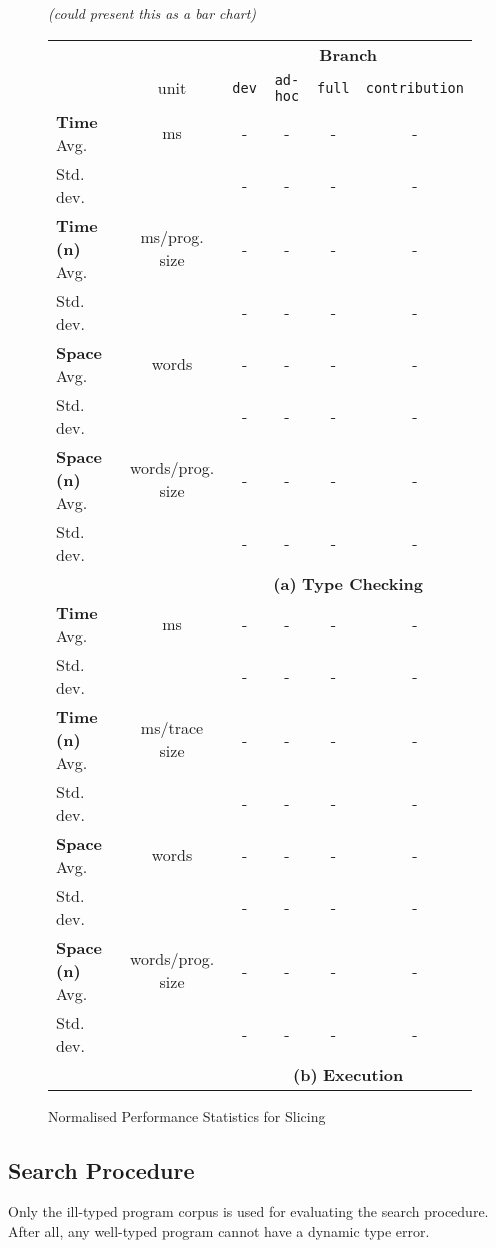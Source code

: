 \begin{figure}
  \centering
  \textit{(could present this as a bar chart)}
  \begin{tabular}{lc|cccc}
  & & \multicolumn{4}{c}{\textbf{Branch}}\\
   & unit & \texttt{dev} & \texttt{ad-hoc} & \texttt{full} & \texttt{contribution}\\
   \hline
   \textbf{Time} Avg. & ms &  - & - & - & -\\
   Std. dev. &  &  - & - & - & -\\
   \textbf{Time (n)} Avg.& ms/prog. size& - & - & - & -\\
   Std. dev. &  &  - & - & - & -\\
   \textbf{Space} Avg. & words& - & - & - & -\\
   Std. dev. &  &  - & - & - & -\\
   \textbf{Space (n)} Avg. & words/prog. size& - & - & - & -\\
   Std. dev. &  &  - & - & - & -\\
   && \multicolumn{4}{c}{\textbf{(a)} \textbf{Type Checking}}\\
   \hline
   \textbf{Time} Avg. & ms & - & - & - & -\\
   Std. dev. &  &  - & - & - & -\\
   \textbf{Time (n)} Avg. & ms/trace size& - & - & - & -\\
   Std. dev. &  &  - & - & - & -\\
   \textbf{Space} Avg. & words & - & - & - & -\\
   Std. dev. &  &  - & - & - & -\\
   \textbf{Space (n)} Avg. & words/prog. size& - & - & - & -\\
   Std. dev. &  &  - & - & - & -\\
   & &\multicolumn{4}{c}{\textbf{(b)} \textbf{Execution}}\\
  \end{tabular}
  
\caption{Normalised Performance Statistics for Slicing}
\label{fig:SlicingPerformance}
\end{figure}

\subsection{Search Procedure}
Only the ill-typed program corpus is used for evaluating the search procedure. After all, any well-typed program cannot have a dynamic type error.

